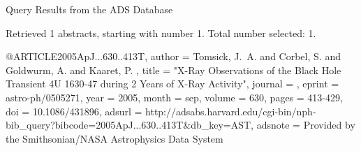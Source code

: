 Query Results from the ADS Database


Retrieved 1 abstracts, starting with number 1.  Total number selected: 1.

@ARTICLE{2005ApJ...630..413T,
   author = {{Tomsick}, J.~A. and {Corbel}, S. and {Goldwurm}, A. and {Kaaret}, P.
	},
    title = "{X-Ray Observations of the Black Hole Transient 4U 1630-47 during 2 Years of X-Ray Activity}",
  journal = {\apj},
   eprint = {astro-ph/0505271},
     year = 2005,
    month = sep,
   volume = 630,
    pages = {413-429},
      doi = {10.1086/431896},
   adsurl = {http://adsabs.harvard.edu/cgi-bin/nph-bib_query?bibcode=2005ApJ...630..413T&db_key=AST},
  adsnote = {Provided by the Smithsonian/NASA Astrophysics Data System}
}


